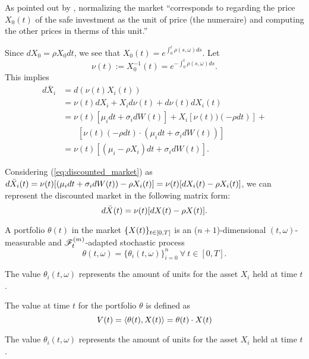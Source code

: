 \documentclass[../TGMAFFIRO.tex]{subfiles}
\begin{document}
As pointed out by , normalizing the market ``corresponds to regarding the price $X_0(t)$ of the safe investment as the unit of price (the numeraire) and computing the other prices in therms of this unit.''

\begin{remark}
	Since $dX_0 = \rho X_0 dt$, we see that $X_0(t) = e^{\int_0^t\rho(s,\omega) ds}$. Let
	\begin{equation}
		\nu(t) := X^{-1}_0(t) = e^{-\int_0^t\rho(s,\omega) ds}.
	\end{equation}
This implies
\begin{align}
	d\bar X_i &= d\left(\nu(t)X_i(t)\right) \nonumber \\
			&= \nu(t)dX_i + X_id\nu(t) + d\nu(t)dX_i(t)\nonumber\\
			&= \nu(t) [\mu_i dt + \sigma_i dW(t)] + X_i[\nu(t))(-\rho dt)] + \nonumber\\
			&\phantom{{}=1} [\nu(t)(-\rho dt)\cdot(\mu_i dt + \sigma_i dW(t))]\nonumber\\
			&=\nu(t)[(\mu_i - \rho X_i)dt + \sigma_i dW(t)] \label{eq:discounted_market}.
\end{align}

Considering (\ref{eq:discounted_market}) as $d\bar{X}_i(t) = \nu(t)[(\mu_i dt + \sigma_i dW(t)) - \rho X_i(t)] = \nu(t)[dX_i(t) - \rho X_i(t)]$, we can represent the discounted market in the following matrix form:
\begin{equation}
  d\bar{X}(t) = \nu(t)[dX(t) - \rho X(t)]. \label{eq:discounted_market_matrix}
\end{equation}

\end{remark}

\begin{definition}
	A portfolio $\theta(t)$ in the market $\{X(t)\}_{t\in[0,T]}$ is an ($n+1$)-dimensional $(t,\omega)$-measurable and $\mathscr{F}_t^{(m)}$-adapted stochastic process
	\begin{equation}
		\theta(t,\omega) = \{\theta_{i}(t,\omega)\}_{i=0}^{n} \ \forall \ t\in[0, T].
	\end{equation}
\end{definition}

The value $\theta_i(t,\omega)$ represents the amount of units for the asset $X_i$ held at time $t$.

\begin{definition}
	The value at time $t$ for the portfolio $\theta$ is defined as
	\begin{equation}
		V(t) = \langle \theta(t), X(t)\rangle = \theta(t) \cdot X(t)
	\end{equation}
\end{definition}
The value $\theta_i(t,\omega)$ represents the amount of units for the asset $X_i$ held at time $t$.
\end{document}
